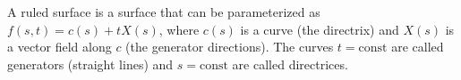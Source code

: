 A ruled surface is a surface that can be parameterized as $f(s, t) = c(s) + t X(s)$, where $c(s)$ is a curve (the directrix) and $X(s)$ is a vector field along $c$ (the generator directions). The curves $t = \text{const}$ are called generators (straight lines) and $s = \text{const}$ are called directrices.